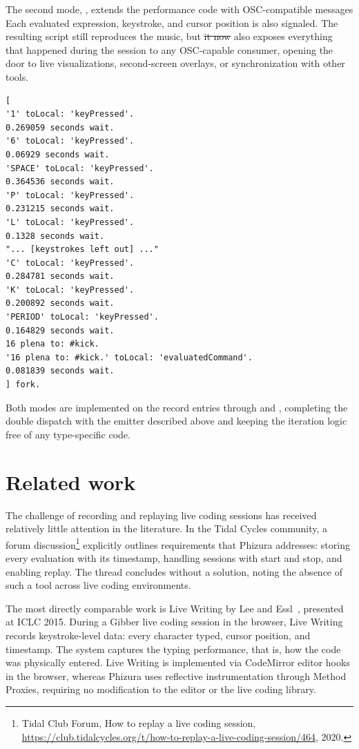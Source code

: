 \documentclass[
]{ceurart}
\providecommand{\DIFdel}[1]{{\protect\color{red}\sout{#1}}} %
\providecommand{\DIFdelbegin}{} %
\providecommand{\DIFdelend}{} %
\newcommand{\DIFscaledelfig}{0.5}
\newlength{\DIFdelgraphicswidth} %
\newlength{\DIFdelgraphicsheight} %
\newcommand{\DIFdelincludegraphics}[2][]{%
\sbox{\DIFdelgraphicsbox}{\DIFOincludegraphics[#1]{#2}}%
\settoboxwidth{\DIFdelgraphicswidth}{\DIFdelgraphicsbox} %
\settoboxtotalheight{\DIFdelgraphicsheight}{\DIFdelgraphicsbox} %
\scalebox{\DIFscaledelfig}{%
\parbox[b]{\DIFdelgraphicswidth}{\usebox{\DIFdelgraphicsbox}\\[-\baselineskip] \rule{\DIFdelgraphicswidth}{0em}}\llap{\resizebox{\DIFdelgraphicswidth}{\DIFdelgraphicsheight}{%
\setlength{\unitlength}{\DIFdelgraphicswidth}%
\begin{picture}(1,1)%
\thicklines\linethickness{2pt} %
{\color[rgb]{1,0,0}\put(0,0){\framebox(1,1){}}}%
{\color[rgb]{1,0,0}\put(0,0){\line( 1,1){1}}}%
{\color[rgb]{1,0,0}\put(0,1){\line(1,-1){1}}}%
\end{picture}%
}\hspace*{3pt}}} %
} %
\DeclareRobustCommand{\DIFdelbegin}{\DIFOdelbegin \let\includegraphics\DIFdelincludegraphics} %
\DeclareRobustCommand{\DIFdelend}{\DIFOaddend \let\includegraphics\DIFOincludegraphics} %
\begin{document}
The second mode, , extends the performance code with OSC-compatible messages
Each evaluated expression, keystroke, and cursor position is also signaled.
The resulting script still reproduces the music, but \DIFdelbegin \DIFdel{it now }\DIFdelend also exposes everything that happened during the session to any OSC-capable consumer, opening the door to live visualizations, second-screen overlays, or synchronization with other tools.

\begin{lstlisting}[label={lst:emitted-mooflod},caption={Example of emitted MoofLOD code (middle elided)}]
[
'1' toLocal: 'keyPressed'.
0.269059 seconds wait.
'6' toLocal: 'keyPressed'.
0.06929 seconds wait.
'SPACE' toLocal: 'keyPressed'.
0.364536 seconds wait.
'P' toLocal: 'keyPressed'.
0.231215 seconds wait.
'L' toLocal: 'keyPressed'.
0.1328 seconds wait.
"... [keystrokes left out] ..."
'C' toLocal: 'keyPressed'.
0.284781 seconds wait.
'K' toLocal: 'keyPressed'.
0.200892 seconds wait.
'PERIOD' toLocal: 'keyPressed'.
0.164829 seconds wait.
16 plena to: #kick.
'16 plena to: #kick.' toLocal: 'evaluatedCommand'.
0.081839 seconds wait.
] fork.
\end{lstlisting}

Both modes are implemented on the record entries through  and , completing the double dispatch with the emitter described above and keeping the iteration logic free of any type-specific code.

\section{Related work}

The challenge of recording and replaying live coding sessions has received relatively little attention in the literature. In the Tidal Cycles community, a forum discussion\footnote{Tidal Club Forum, How to replay a live coding session, \url{https://club.tidalcycles.org/t/how-to-replay-a-live-coding-session/464}, 2020.} explicitly outlines requirements that Phizura addresses: storing every evaluation with its timestamp, handling sessions with start and stop, and enabling replay. The thread concludes without a solution, noting the absence of such a tool across live coding environments.

The most directly comparable work is Live Writing by Lee and Essl~\cite{Lee15a}, presented at ICLC 2015. During a Gibber live coding session in the browser, Live Writing records keystroke-level data: every character typed, cursor position, and timestamp. The system captures the typing performance, that is, how the code was physically entered. Live Writing is implemented via CodeMirror editor hooks in the browser, whereas Phizura uses reflective instrumentation through Method Proxies, requiring no modification to the editor or the live coding library.
\end{document}
